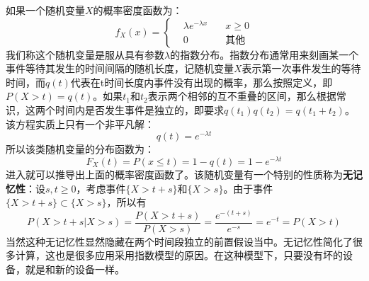 \documentclass{ctexart}
\begin{document}
                如果一个随机变量$X$的概率密度函数为：
                \begin{equation}
                    f_X(x) = \left\{
                    \begin{split}
                        &\lambda e^{-\lambda x} \quad &x\ge 0 \\
                        &0                            &\text{其他}
                    \end{split}
                    \right.
                \end{equation}
                我们称这个随机变量是服从具有参数$\lambda$的指数分布。指数分布通常用来刻画某一个事件等待其发生的时间间隔的随机长度，记随机变量$X$表示第一次事件发生的等待时间，而$q(t)$代表在t时间长度内事件没有出现的概率，那么按照定义，即$P(X>t)=q(t)$。如果$t_1$和$t_2$表示两个相邻的互不重叠的区间，那么根据常识，这两个时间内是否发生事件是独立的，即要求$q(t_1)q(t_2)=q(t_1 + t_2)$。该方程实质上只有一个非平凡解：
                $$
                    q(t) = e^{-\lambda t}
                $$
                所以该类随机变量的分布函数为：
                \begin{equation}
                    F_X(t) = P(x\le t) = 1-q(t) = 1-e^{-\lambda t}
                \end{equation}
                进入就可以推导出上面的概率密度函数了。该随机变量有一个特别的性质称为\textbf{无记忆性}：设$s,t\ge 0$，考虑事件$\{X>t+s\}$和$\{X>s\}$。由于事件$\{X>t+s\}\subset \{X>s\}$，所以有
                \begin{equation}
                    P(X > t+s | X>s) = \frac{P(X>t+s)}{P(X>s)} = \frac{e^{-(t+s)}}{e^{-s}} = e^{-t} = P(X>t)
                \end{equation}
                当然这种无记忆性显然隐藏在两个时间段独立的前置假设当中。无记忆性简化了很多计算，这也是很多应用采用指数模型的原因。在这种模型下，只要没有坏的设备，就是和新的设备一样。
                
\end{document}
